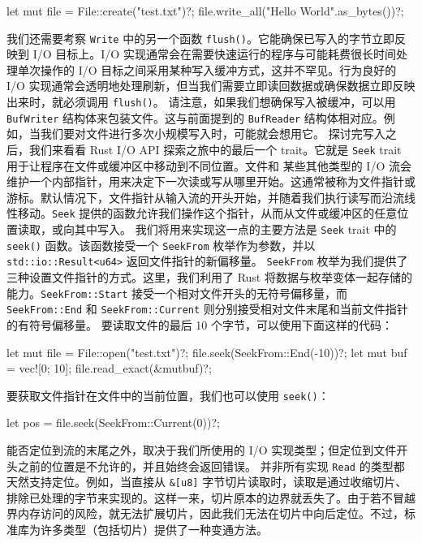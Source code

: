 \begin{codebox}[rust]
let mut file = File::create("test.txt")?;
file.write_all("Hello World\n".as_bytes())?;
\end{codebox}
\label{idx:idx_10d5ef03}
我们还需要考察 \texttt{Write} 中的另一个函数 \texttt{flush()}。它能确保已写入的字节立即反映到 I/\allowbreak{}O 目标上。I/\allowbreak{}O 实现通常会在需要快速运行的程序与可能耗费很长时间处理单次操作的 I/\allowbreak{}O 目标之间采用某种写入缓冲方式，这并不罕见。行为良好的 I/\allowbreak{}O 实现通常会透明地处理刷新，但当我们需要立即读回数据或确保数据立即反映出来时，就必须调用 \texttt{flush()}。
请注意，如果我们想确保写入被缓冲，可以用 \texttt{BufWriter} 结构体来包装文件。这与前面提到的 \texttt{BufReader} 结构体相对应。例如，当我们要对文件进行多次小规模写入时，可能就会想用它。
探讨完写入之后，我们来看看 Rust I/\allowbreak{}O API 探索之旅中的最后一个 trait。它就是
\texttt{Seek} trait 用于让程序在文件或缓冲区中移动到不同位置。文件和
\label{idx:idx_b3b27c7a}
某些其他类型的 I/\allowbreak{}O 流会维护一个内部指针，用来决定下一次读或写从哪里开始。这通常被称为文件指针或游标。默认情况下，文件指针从输入流的开头开始，并随着我们执行读写而沿流线性移动。\texttt{Seek} 提供的函数允许我们操作这个指针，从而从文件或缓冲区的任意位置读取，或向其中写入。
我们将用来实现这一点的主要方法是 \texttt{Seek} trait 中的 \texttt{seek()} 函数。该函数接受一个 \texttt{SeekFrom} 枚举作为参数，并以 \texttt{std::\allowbreak{}io::\allowbreak{}Result<\allowbreak{}u64>\allowbreak{}} 返回文件指针的新偏移量。
\texttt{SeekFrom} 枚举为我们提供了三种设置文件指针的方式。这里，我们利用了 Rust 将数据与枚举变体一起存储的能力。\texttt{SeekFrom::\allowbreak{}Start} 接受一个相对文件开头的无符号偏移量，而 \texttt{SeekFrom::\allowbreak{}End} 和 \texttt{SeekFrom::\allowbreak{}Current} 则分别接受相对文件末尾和当前文件指针的有符号偏移量。
要读取文件的最后 10 个字节，可以使用下面这样的代码：
\begin{codebox}[rust]
let mut file = File::open("test.txt")?;
file.seek(SeekFrom::End(-10))?;
let mut buf = vec![0; 10];
file.read_exact(&mutbuf)?;
\end{codebox}
要获取文件指针在文件中的当前位置，我们也可以使用 \texttt{seek()}：
\begin{codebox}[rust]
let pos = file.seek(SeekFrom::Current(0))?;
\end{codebox}
能否定位到流的末尾之外，取决于我们所使用的 I/\allowbreak{}O 实现类型；但定位到文件开头之前的位置是不允许的，并且始终会返回错误。
并非所有实现 \texttt{Read} 的类型都天然支持定位。例如，当直接从 \texttt{\&[u8]} 字节切片读取时，读取是通过收缩切片、排除已处理的字节来实现的。这样一来，切片原本的边界就丢失了。由于若不冒越界内存访问的风险，就无法扩展切片，因此我们无法在切片中向后定位。不过，标准库为许多类型（包括切片）提供了一种变通方法。
